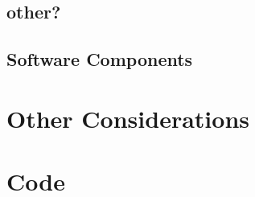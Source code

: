 \documentclass{article}	%
\begin{document}
\begin{multicols}{2}
\subsection{other?}

\subsection{Software Components}

\newpage
\section{Other Considerations}

\end{multicols}

\newpage
\section{Code}




%
%





\end{document}
